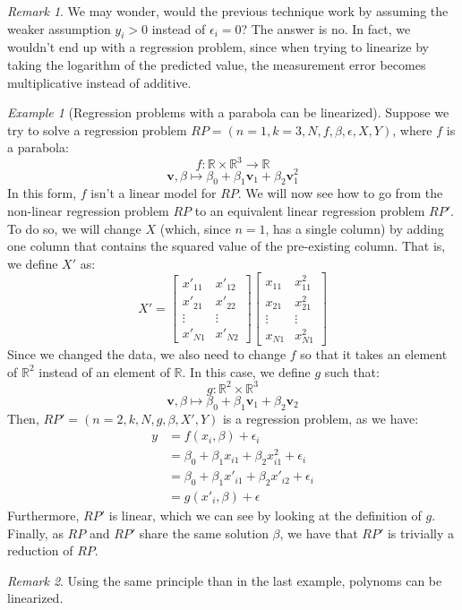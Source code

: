 \documentclass{article}
\theoremstyle{definition}
\theoremstyle{remark}
\newtheorem*{remark}{Remark}
\theoremstyle{example}
\newtheorem{example}{Example}[section]
\newcommand{\vv}{\mathbf{v}}
\begin{document}
\begin{remark}
		We may wonder, would the previous technique work by assuming the weaker assumption $y_i > 0$ instead of $\epsilon_i = 0$? The answer is no. In fact, we wouldn't end up with a regression problem, since when trying to linearize by taking the logarithm of the predicted value, the measurement error becomes multiplicative instead of additive.
\end{remark}

\begin{example}[Regression problems with a parabola can be linearized]
		Suppose we try to solve a regression problem $RP = (n=1, k=3, N, f, \beta, \epsilon, X, Y)$, where $f$ is a parabola:
				$$f : \mathbb{R} \times \mathbb{R}^3 \rightarrow \mathbb{R}$$
				$$\vv, \beta \mapsto \beta_0 + \beta_1 \vv_1 + \beta_2 \vv_1^2$$
		In this form, $f$ isn't a linear model for $RP$. We will now see how to go from the non-linear regression problem $RP$ to an equivalent linear regression problem $RP'$. To do so, we will change $X$ (which, since $n=1$, has a single column) by adding one column that contains the squared value of the pre-existing column. That is, we define $X'$ as:
				$$X' = \begin{bmatrix} x'_{11} & x'_{12} \\ x'_{21} & x'_{22} \\ \vdots & \vdots \\ x'_{N1} & x'_{N2} \end{bmatrix} \begin{bmatrix} x_{11} & x_{11}^2 \\ x_{21} & x_{21}^2 \\ \vdots & \vdots \\ x_{N1} & x_{N1}^2 \end{bmatrix}$$
		Since we changed the data, we also need to change $f$ so that it takes an element of $\mathbb{R}^2$ instead of an element of $\mathbb{R}$. In this case, we define $g$ such that:
				$$g : \mathbb{R}^2 \times \mathbb{R}^3$$
				$$\vv, \beta \mapsto \beta_0 + \beta_1 \vv_1 + \beta_2 \vv_2$$
		Then, $RP' = (n=2, k, N, g, \beta, X', Y)$ is a regression problem, as we have:
		\begin{align*}
				y &= f(x_i, \beta) + \epsilon_i\\
				  &= \beta_0 + \beta_1 x_{i1} + \beta_2 x_{i1}^2 + \epsilon_i\\
				  &= \beta_0 + \beta_1 x'_{i1} + \beta_2 x'_{i2} + \epsilon_i\\
				  &= g(x'_i, \beta) + \epsilon
		\end{align*}
		Furthermore, $RP'$ is linear, which we can see by looking at the definition of $g$. Finally, as $RP$ and $RP'$ share the same solution $\beta$, we have that $RP'$ is trivially a reduction of $RP$.
\end{example}

\begin{remark}
		Using the same principle than in the last example, polynoms can be linearized.
\end{remark}
\end{document}
